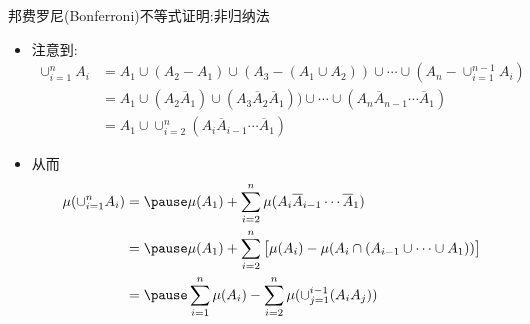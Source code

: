 \documentclass[Prob-All.tex]{subfiles}
\begin{document}






\begin{frame}{邦费罗尼({\rm Bonferroni})不等式证明:非归纳法}
	\begin{itemize}[<+-|alert@+>]
		\item 注意到:
		\begin{align*}
		  \cup_{i=1}^nA_i&=A_1\cup (A_2-A_1)\cup(A_3-(A_1\cup A_2))\cup\cdots\cup(A_n-\cup_{i=1}^{n-1} A_i) \\
		   &=A_1\cup (A_2\overline{A}_1)\cup(A_3\overline{A}_2\overline{A}_1))\cup\cdots\cup(A_n\overline{A}_{n-1}\cdots\overline{A}_1)\\
		   &=A_1\cup \cup_{i=2}^n (A_i\overline{A}_{i-1}\cdots\overline{A}_1)
		\end{align*}
		\item 从而
		\begin{align*}
		  \mu(\cup_{i=1}^nA_i) &=\pause \mu(A_1)+\sum_{i=2}^n\mu(A_i\overline{A}_{i-1}\cdots\overline{A}_1) \\
		   & =\pause \mu(A_1)+\sum_{i=2}^n\big[\mu(A_i)-\mu(A_i\cap (A_{i-1}\cup \cdots \cup A_1))\big] \\
		   &=\pause \sum_{i=1}^n\mu(A_i)-\sum_{i=2}^n\mu(\cup_{j=1}^{i-1}(A_iA_j))%
		\end{align*}
	\end{itemize}

	\end{frame}
\end{document}
